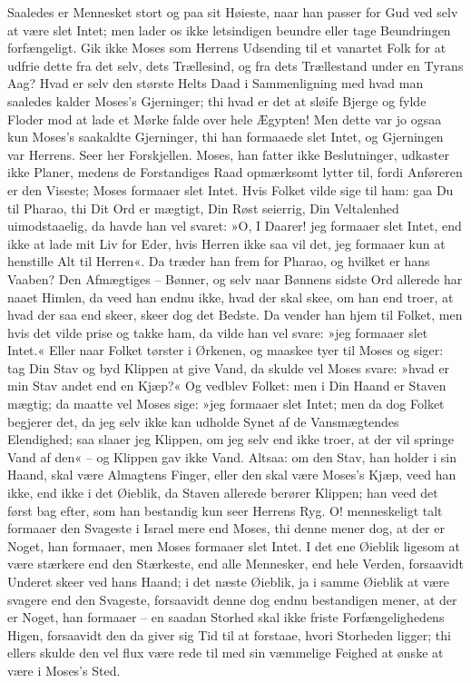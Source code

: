\documentclass[12pt,a4paper]{article}
\begin{document}
Saaledes er Mennesket stort og paa sit Høieste, naar han passer for Gud ved selv at være slet Intet; men lader os ikke letsindigen beundre eller tage Beundringen forfængeligt. Gik ikke Moses som Herrens Udsending til et vanartet Folk for at udfrie dette fra det selv, dets Trællesind, og fra dets Trællestand under en Tyrans Aag? Hvad er selv den største Helts Daad i Sammenligning med hvad man saaledes kalder Moses's Gjerninger; thi hvad er det at sløife Bjerge og fylde Floder mod at lade et Mørke falde over hele Ægypten! Men dette var jo ogsaa kun Moses's saakaldte Gjerninger, thi han formaaede slet Intet, og Gjerningen var Herrens. Seer her Forskjellen. Moses, han fatter ikke Beslutninger, udkaster ikke Planer, medens de Forstandiges Raad opmærksomt lytter til, fordi Anføreren er den Viseste; Moses formaaer slet Intet. Hvis Folket vilde sige til ham: gaa Du til Pharao, thi Dit Ord er mægtigt, Din Røst seierrig, Din Veltalenhed uimodstaaelig, da havde han vel svaret: »O, I Daarer! jeg formaaer slet Intet, end ikke at lade mit Liv for Eder, hvis Herren ikke saa vil det, jeg formaaer kun at henstille Alt til Herren«. Da træder han frem for Pharao, og hvilket er hans Vaaben? Den Afmægtiges – Bønner, og selv naar Bønnens sidste Ord allerede har naaet Himlen, da veed han endnu ikke, hvad der skal skee, om han end troer, at hvad der saa end skeer, skeer dog det Bedste. Da vender han hjem til Folket, men hvis det vilde prise og takke ham, da vilde han vel svare: »jeg formaaer slet Intet.« Eller naar Folket tørster i Ørkenen, og maaskee tyer til Moses og siger: tag Din Stav og byd Klippen at give Vand, da skulde vel Moses svare: »hvad er min Stav andet end en Kjæp?« Og vedblev Folket: men i Din Haand er Staven mægtig; da maatte vel Moses sige: »jeg formaaer slet Intet; men da dog Folket begjerer det, da jeg selv ikke kan udholde Synet af de Vansmægtendes Elendighed; saa slaaer jeg Klippen, om jeg selv end ikke troer, at der vil springe Vand af den« – og Klippen gav ikke Vand. Altsaa: om den Stav, han holder i sin Haand, skal være Almagtens Finger, eller den skal være Moses's Kjæp, veed han ikke, end ikke i det Øieblik, da Staven allerede berører Klippen; han veed det først bag efter, som han bestandig kun seer Herrens Ryg. O! menneskeligt talt formaaer den Svageste i Israel mere end Moses, thi denne mener dog, at der er Noget, han formaaer, men Moses formaaer slet Intet. I det ene Øieblik ligesom at være stærkere end den Stærkeste, end alle Mennesker, end hele Verden, forsaavidt Underet skeer ved hans Haand; i det næste Øieblik, ja i samme Øieblik at være svagere end den Svageste, forsaavidt denne dog endnu bestandigen mener, at der er Noget, han formaaer – en saadan Storhed skal ikke friste Forfængelighedens Higen, forsaavidt den da giver sig Tid til at forstaae, hvori Storheden ligger; thi ellers skulde den vel flux være rede til med sin væmmelige Feighed at ønske at være i Moses's Sted.
\end{document}
